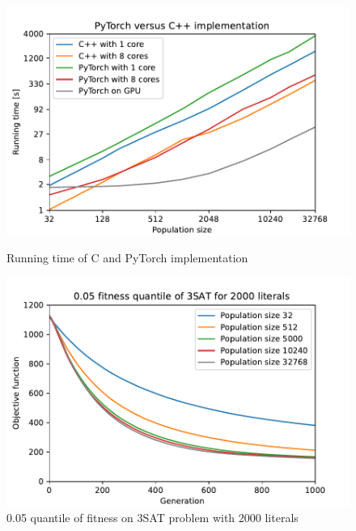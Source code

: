 \begin{figure}
    \begin{minipage}[t]{0.48\textwidth}
        \includegraphics[width=\textwidth]{img/runs/time_ga_c_with_legend.pdf}
        \caption{Running time of C and PyTorch implementation}
        \label{fig:gapytorchvsc}
    \end{minipage}
    \hfill
    \begin{minipage}[t]{0.48\textwidth}
        \includegraphics[width=\textwidth]{img/runs/fitness_ga_with_legend.pdf}
        \caption[Fitness of GA on 3SAT problem]{0.05 quantile of fitness on 3SAT problem with 2000 literals}
        \label{fig:gafitness}
    \end{minipage}


\end{figure}
